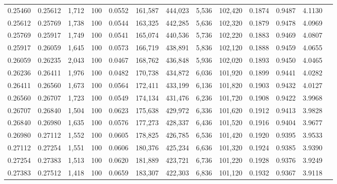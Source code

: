 \begin{tabular}{rrrrrrrrrrrrr}
0.25460 & 0.25612 & 1,712 & 100 &                                     0.0552 & 161,587 & 444,023 &   5,536 & 102,420 & 0.1874 & 0.9487 & 4.1130 \\
0.25612 & 0.25769 & 1,738 & 100 &                                     0.0544 & 163,325 & 442,285 &   5,636 & 102,320 & 0.1879 & 0.9478 & 4.0969 \\
0.25769 & 0.25917 & 1,749 & 100 &                                     0.0541 & 165,074 & 440,536 &   5,736 & 102,220 & 0.1883 & 0.9469 & 4.0807 \\
0.25917 & 0.26059 & 1,645 & 100 &                                     0.0573 & 166,719 & 438,891 &   5,836 & 102,120 & 0.1888 & 0.9459 & 4.0655 \\
0.26059 & 0.26235 & 2,043 & 100 &                                     0.0467 & 168,762 & 436,848 &   5,936 & 102,020 & 0.1893 & 0.9450 & 4.0465 \\
0.26236 & 0.26411 & 1,976 & 100 &                                     0.0482 & 170,738 & 434,872 &   6,036 & 101,920 & 0.1899 & 0.9441 & 4.0282 \\
0.26411 & 0.26560 & 1,673 & 100 &                                     0.0564 & 172,411 & 433,199 &   6,136 & 101,820 & 0.1903 & 0.9432 & 4.0127 \\
0.26560 & 0.26707 & 1,723 & 100 &                                     0.0549 & 174,134 & 431,476 &   6,236 & 101,720 & 0.1908 & 0.9422 & 3.9968 \\
0.26707 & 0.26840 & 1,504 & 100 &                                     0.0623 & 175,638 & 429,972 &   6,336 & 101,620 & 0.1912 & 0.9413 & 3.9828 \\
0.26840 & 0.26980 & 1,635 & 100 &                                     0.0576 & 177,273 & 428,337 &   6,436 & 101,520 & 0.1916 & 0.9404 & 3.9677 \\
0.26980 & 0.27112 & 1,552 & 100 &                                     0.0605 & 178,825 & 426,785 &   6,536 & 101,420 & 0.1920 & 0.9395 & 3.9533 \\
0.27112 & 0.27254 & 1,551 & 100 &                                     0.0606 & 180,376 & 425,234 &   6,636 & 101,320 & 0.1924 & 0.9385 & 3.9390 \\
0.27254 & 0.27383 & 1,513 & 100 &                                     0.0620 & 181,889 & 423,721 &   6,736 & 101,220 & 0.1928 & 0.9376 & 3.9249 \\
0.27383 & 0.27512 & 1,418 & 100 &                                     0.0659 & 183,307 & 422,303 &   6,836 & 101,120 & 0.1932 & 0.9367 & 3.9118 \\

\end{tabular}
